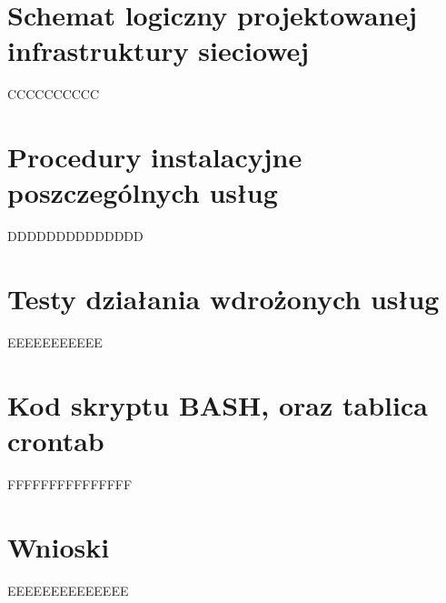 \documentclass[a4paper]{article}
\begin{document}
\section{Schemat logiczny projektowanej infrastruktury sieciowej}
CCCCCCCCCC
\section{Procedury instalacyjne poszczególnych usług}
DDDDDDDDDDDDDD
\section{Testy działania wdrożonych usług}
EEEEEEEEEEE
\section{Kod skryptu BASH, oraz tablica crontab}
FFFFFFFFFFFFFFF
\section{Wnioski}
EEEEEEEEEEEEEE
\newpage
\nocite{k8s-docs}
\nocite{k8s-blog}
\nocite{k8s-github}
\printbibliography[heading=bibnumbered, label=Literatura, title=Literatura]
\end{document}
